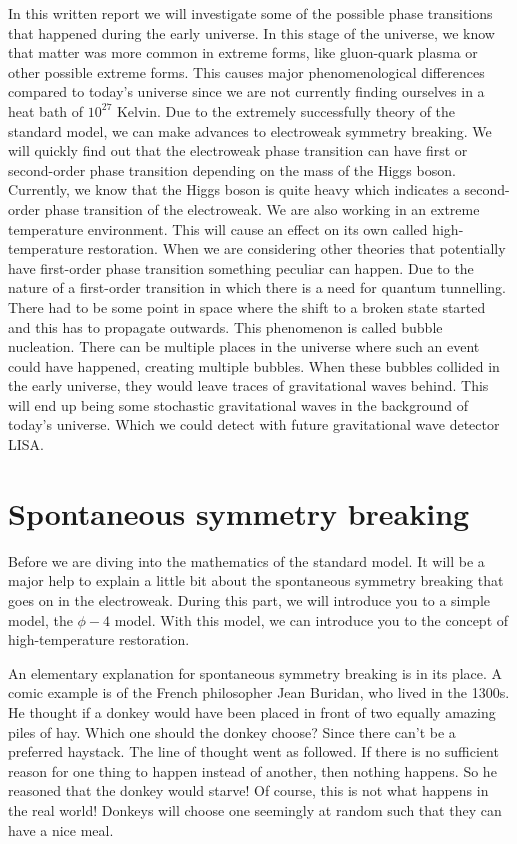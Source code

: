 \documentclass{article}
\numberwithin{equation}{section}
\begin{document}
In this written report we will investigate some of the possible phase transitions that happened during the early universe. 
In this stage of the universe, we know that matter was more common in extreme forms, like gluon-quark plasma or other possible extreme forms.
This causes major phenomenological differences compared to today's universe since we are not currently finding ourselves in a heat bath of $10^{27}$ Kelvin.
Due to the extremely successfully theory of the standard model, we can make advances to electroweak symmetry breaking.
We will quickly find out that the electroweak phase transition can have first or second-order phase transition depending on the mass of the Higgs boson.
Currently, we know that the Higgs boson is quite heavy which indicates a second-order phase transition of the electroweak.
We are also working in an extreme temperature environment.
This will cause an effect on its own called high-temperature restoration.
When we are considering other theories that potentially have first-order phase transition something peculiar can happen.
Due to the nature of a first-order transition in which there is a need for quantum tunnelling.
There had to be some point in space where the shift to a broken state started and this has to propagate outwards.
This phenomenon is called bubble nucleation.
There can be multiple places in the universe where such an event could have happened, creating multiple bubbles.
When these bubbles collided in the early universe, they would leave traces of gravitational waves behind.
This will end up being some stochastic gravitational waves in the background of today's universe.
Which we could detect with future gravitational wave detector LISA.


\section{Spontaneous symmetry breaking}

Before we are diving into the mathematics of the standard model.
It will be a major help to explain a little bit about the spontaneous symmetry breaking that goes on in the electroweak.
During this part, we will introduce you to a simple model, the $\phi-4$ model.
With this model, we can introduce you to the concept of high-temperature restoration.

\vspace{20px}

An elementary explanation for spontaneous symmetry breaking is in its place.
A comic example is of the French philosopher Jean Buridan, who lived in the 1300s.
He thought if a donkey would have been placed in front of two equally amazing piles of hay.
Which one should the donkey choose?
Since there can't be a preferred haystack. 
The line of thought went as followed.
If there is no sufficient reason for one thing to happen instead of another, then nothing happens.
So he reasoned that the donkey would starve!
Of course, this is not what happens in the real world! 
Donkeys will choose one seemingly at random such that they can have a nice meal.
\end{document}
